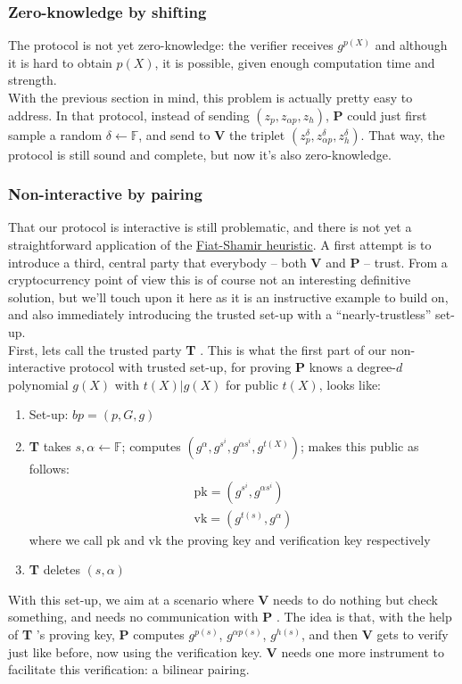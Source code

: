 \documentclass[11pt,oneside]{article}
\newcommand{\bea}{\begin{eqnarray}}
\newcommand{\eea}{\end{eqnarray}}
\newcommand{\bP}{\textbf{P} }
\newcommand{\bV}{\textbf{V} }
\newcommand{\bT}{\textbf{T} }
\theoremstyle{definition}
\theoremstyle{remark}
\numberwithin{equation}{section}
\begin{document}
\subsubsection{Zero-knowledge by shifting}

The protocol is not yet zero-knowledge: the verifier receives $g^{p(X)}$ and
although it is hard to obtain $p(X)$, it is possible, given enough computation
time and strength.\\ With the previous section in mind, this problem is actually
pretty easy to address. In that protocol, instead of sending $(z_p,z_{\alpha
p},z_h)$, \bP could just first sample a random $\delta\leftarrow\mathbb{F}$, and
send to \bV the triplet $(z_p^\delta,z_{\alpha p}^\delta,z_h^\delta)$. That way,
the protocol is still sound and complete, but now it's also zero-knowledge. 

\subsubsection{Non-interactive by pairing}

That our protocol is interactive is still problematic, and there is not yet a
straightforward application of the \hyperlink{box:schnorr}{Fiat-Shamir
heuristic}. A first attempt is to introduce a third, central party that
everybody -- both \bV and \bP -- trust. From a cryptocurrency point of view this
is of course not an interesting definitive solution, but we'll touch upon it
here as it is an instructive example to build on, and also immediately
introducing the trusted set-up with a ``nearly-trustless'' set-up.\\ First, lets
call the trusted party \bT. This is what the first part of our non-interactive
protocol with trusted set-up, for proving \bP knows a degree-$d$ polynomial
$g(X)$ with $t(X)|g(X)$ for public $t(X)$, looks like:

\begin{enumerate}
\item Set-up: $bp=(p,G,g)$
\item \bT takes $s,\alpha\leftarrow\mathbb{F}$; computes
  $(g^\alpha,g^{s^i},g^{\alpha s^i},g^{t(X)})$; makes this public as follows:
\bea \text{pk} =(g^{s^i},g^{\alpha s^i}) \\
 \text{vk} = (g^{t(s)},g^{\alpha})
 \eea
 where we call pk and vk the proving key and verification key respectively
 \item \bT deletes $(s,\alpha)$
\end{enumerate}
With this set-up, we aim at a scenario where \bV needs to do nothing but check
something, and needs no communication with \bP. The idea is that, with the help
of \bT\!'s proving key, \bP computes $g^{p(s)}$, $g^{\alpha p(s)}$, $g^{h(s)}$,
and then \bV gets to verify just like before, now using the verification key.
\bV needs one more instrument to facilitate this verification: a bilinear
pairing.\\
\end{document}
